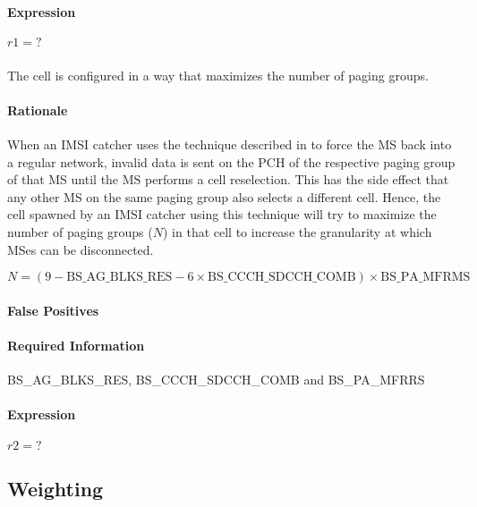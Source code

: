 \documentclass[a4paper,11pt,notitlepage,bigheadings,oneside]{scrartcl}
\begin{document}
\paragraph{Expression}

$r1 = ?$

\subsubsection{}

The cell is configured in a way that maximizes the number of paging groups.

\paragraph{Rationale}

When an IMSI catcher uses the technique described in
\cite[0021]{bott2000verfahren} to force the MS back into a regular network,
invalid data is sent on the PCH of the respective paging group of that MS until
the MS performs a cell reselection. This has the side effect that any other MS
on the same paging group also selects a different cell. Hence, the cell spawned
by an IMSI catcher using this technique will try to maximize the number of
paging groups ($N$) in that cell to increase the granularity at which MSes can
be disconnected.

${N} = (9 - {\text{BS\_AG\_BLKS\_RES}} - 6\times {\text{BS\_CCCH\_SDCCH\_COMB}})\times {\text{BS\_PA\_MFRMS}}$

\paragraph{False Positives}


\paragraph{Required Information}

BS\_AG\_BLKS\_RES, BS\_CCCH\_SDCCH\_COMB and BS\_PA\_MFRRS


\paragraph{Expression}

$r2 = ?$

\subsection{Weighting}
\end{document}
